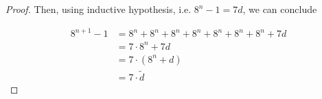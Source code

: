 \documentclass[12pt]{article}
\begin{document}
\begin{itemize}
\begin{proof}
    \bigskip

    Then, using inductive hypothesis, i.e. $8^n-1 = 7d$, we can conclude

    \begin{align}
        8^{n+1} - 1 &= 8^n + 8^n + 8^n + 8^n + 8^n + 8^n + 8^n + 7d\\
        &= 7 \cdot 8^n + 7d\\
        &= 7 \cdot (8^n + d)\\
        &= 7 \cdot \tilde{d}
    \end{align}

    \end{proof}


















\end{itemize}
\end{document}
